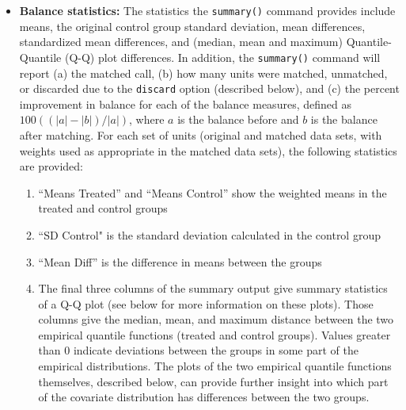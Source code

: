 \begin{itemize}
\item {\bf Balance statistics:} The statistics the \texttt{summary()}
  command provides include means, the original control group standard deviation, 
  mean differences, standardized mean
  differences, and (median, mean and maximum) Quantile-Quantile (Q-Q)
  plot differences.  In addition, the \texttt{summary()} command will
  report (a) the matched call, (b) how many units were matched,
  unmatched, or discarded due to the \texttt{discard} option
  (described below), and (c) the percent improvement in balance for
  each of the balance measures, defined as $100((|a|-|b|)/|a|)$, where
  $a$ is the balance before and $b$ is the balance after matching.
  For each set of units (original and matched data sets, with weights
  used as appropriate in the matched data sets), the
  following statistics are provided:
\begin{enumerate}
  \item ``Means Treated'' and ``Means Control'' show the weighted
    means in the treated and control groups
  \item ``SD Control" is the standard deviation calculated in the control group
  \item ``Mean Diff'' is the difference in means between the groups
  \item The final three columns of the summary output give summary
    statistics of a Q-Q plot (see below for more information on these
    plots). Those columns give the median, mean, and maximum distance
    between the two empirical quantile functions (treated and control
    groups).  Values greater than 0 indicate deviations between the
    groups in some part of the empirical distributions.  The plots of
    the two empirical quantile functions themselves, described below,
    can provide further insight into which part of the covariate
    distribution has differences between the two groups.
\end{enumerate}


\end{itemize}
